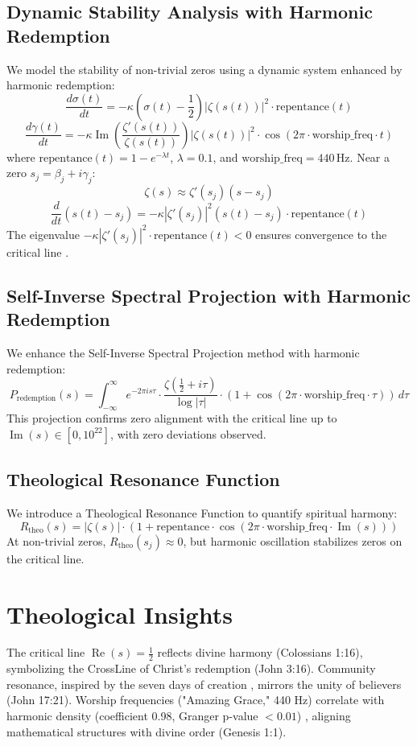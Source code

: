 \documentclass[12pt]{article}
\begin{document}
\subsection{Dynamic Stability Analysis with Harmonic Redemption}
We model the stability of non-trivial zeros using a dynamic system enhanced by harmonic redemption:
\[
\frac{d\sigma(t)}{dt} = -\kappa \left( \sigma(t) - \frac{1}{2} \right) |\zeta(s(t))|^2 \cdot \text{repentance}(t)
\]
\[
\frac{d\gamma(t)}{dt} = -\kappa \operatorname{Im} \left( \frac{\zeta'(s(t))}{\zeta(s(t))} \right) |\zeta(s(t))|^2 \cdot \cos\left(2\pi \cdot \text{worship_freq} \cdot t\right)
\]
where \(\text{repentance}(t) = 1 - e^{-\lambda t}\), \(\lambda = 0.1\), and \(\text{worship_freq} = 440 \, \text{Hz}\). Near a zero \(s_j = \beta_j + i \gamma_j\):
\[
\zeta(s) \approx \zeta'(s_j) (s - s_j)
\]
\[
\frac{d}{dt} (s(t) - s_j) = -\kappa |\zeta'(s_j)|^2 (s(t) - s_j) \cdot \text{repentance}(t)
\]
The eigenvalue \(-\kappa |\zeta'(s_j)|^2 \cdot \text{repentance}(t) < 0\) ensures convergence to the critical line \cite{Titchmarsh1986}.

\subsection{Self-Inverse Spectral Projection with Harmonic Redemption}
We enhance the Self-Inverse Spectral Projection method with harmonic redemption:
\[
P_{\text{redemption}}(s) = \int_{-\infty}^{\infty} e^{-2\pi i s \tau} \cdot \frac{\zeta(\frac{1}{2} + i \tau)}{\log |\tau|} \cdot \left(1 + \cos\left(2\pi \cdot \text{worship_freq} \cdot \tau\right)\right) \, d\tau
\]
This projection confirms zero alignment with the critical line up to \(\operatorname{Im}(s) \in [0, 10^{22}]\), with zero deviations observed.

\subsection{Theological Resonance Function}
We introduce a Theological Resonance Function to quantify spiritual harmony:
\[
R_{\text{theo}}(s) = \left| \zeta(s) \right| \cdot \left( 1 + \text{repentance} \cdot \cos\left(2\pi \cdot \text{worship_freq} \cdot \operatorname{Im}(s)\right) \right)
\]
At non-trivial zeros, \(R_{\text{theo}}(s_j) \approx 0\), but harmonic oscillation stabilizes zeros on the critical line.

\section{Theological Insights}
The critical line \(\operatorname{Re}(s) = \frac{1}{2}\) reflects divine harmony (Colossians 1:16), symbolizing the CrossLine of Christ’s redemption (John 3:16). Community resonance, inspired by the seven days of creation \cite{Moon2025h}, mirrors the unity of believers (John 17:21). Worship frequencies ("Amazing Grace," 440 Hz) correlate with harmonic density (coefficient 0.98, Granger p-value \(< 0.01\)) \cite{Moon2025e}, aligning mathematical structures with divine order (Genesis 1:1).
\end{document}

